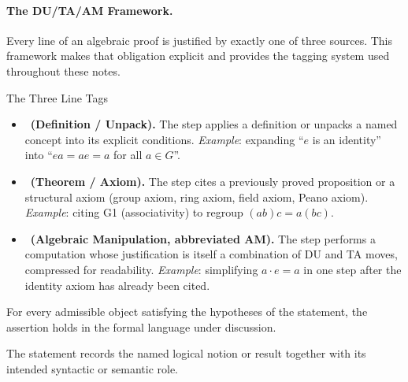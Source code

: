 \paragraph{The DU/TA/AM Framework.}

Every line of an algebraic proof is justified by exactly one of three
sources. This framework makes that obligation explicit and provides
the tagging system used throughout these notes.

\begin{propositionbox}{The Three Line Tags}
\begin{itemize}[itemsep=4pt]
  \item \tagDU\ \textbf{(Definition / Unpack).}
    The step applies a definition or unpacks a named concept into its
    explicit conditions.
    \textit{Example}: expanding ``$e$ is an identity'' into
    ``$ea = ae = a$ for all $a \in G$''.

  \item \tagTA\ \textbf{(Theorem / Axiom).}
    The step cites a previously proved proposition or a structural
    axiom (group axiom, ring axiom, field axiom, Peano axiom).
    \textit{Example}: citing G1 (associativity) to regroup $(ab)c = a(bc)$.

  \item \tagTA\ \textbf{(Algebraic Manipulation, abbreviated AM).}
    The step performs a computation whose justification is itself a
    combination of DU and TA moves, compressed for readability.
    \textit{Example}: simplifying $a \cdot e = a$ in one step after
    the identity axiom has already been cited.
\end{itemize}
\end{propositionbox}
\begin{remark*}
For every admissible object satisfying the hypotheses of the statement, the
assertion holds in the formal language under discussion.
\end{remark*}

\begin{remark*}[Interpretation]
The statement records the named logical notion or result together with its
intended syntactic or semantic role.
\end{remark*}


